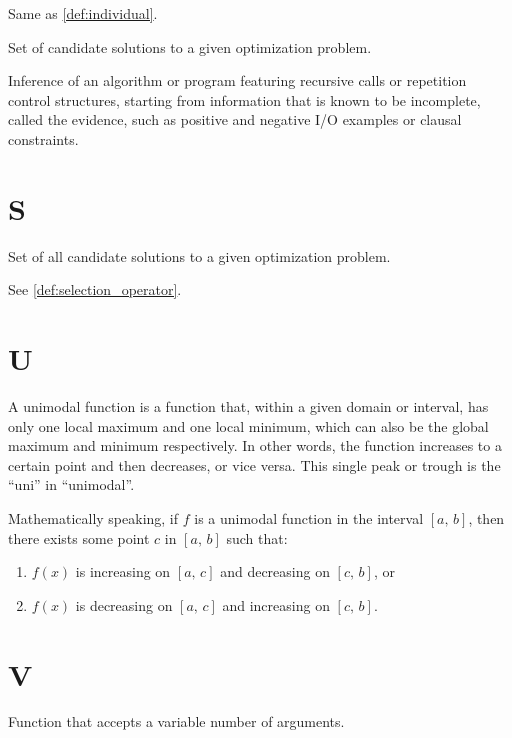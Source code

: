     \begin{definition}[Phenotype]
    \label{def:phenotype}
      Same as \vref{def:individual}.
    \end{definition}

    \begin{definition}[Population]
    \label{def:population}
      Set of candidate solutions to a given optimization problem.
    \end{definition}

    \begin{definition}
    \label{def:program_induction}
      Inference of an algorithm or program featuring recursive calls or 
      repetition control structures, starting from information that is known to 
      be incomplete, called the evidence, such as positive and negative I/O 
      examples or clausal constraints.
    \end{definition}

  \section*{S}
    \begin{definition}
    \label{def:search_space}
      Set of all candidate solutions to a given optimization problem.
    \end{definition}

    \begin{definition}[Selector]
      See \vref{def:selection_operator}.
    \end{definition}

  \section*{U}
    \begin{definition}
    \label{def:unimodal_function}
      A unimodal function is a function that, within a given domain or interval,
      has only one local maximum and one local minimum, which can also be the
      global maximum and minimum respectively.
      In other words, the function increases to a certain point and then 
      decreases, or vice versa.
      This single peak or trough is the \enquote{uni} in \enquote{unimodal}.

      Mathematically speaking, if \(f\) is a unimodal function in the interval 
      \([a,\, b]\), then there exists some point \(c\) in \([a,\, b]\) such 
      that:

      \begin{enumerate}
        \item \(f(x)\) is increasing on \([a,\, c]\) and decreasing on \([c,\, 
          b]\), or
        \item \(f(x)\) is decreasing on \([a,\, c]\) and increasing on \([c,\,
          b]\).
      \end{enumerate}
    \end{definition}

  \section*{V}
    \begin{definition}
    \label{def:variadic_function}
      Function that accepts a variable number of arguments.
    \end{definition}
